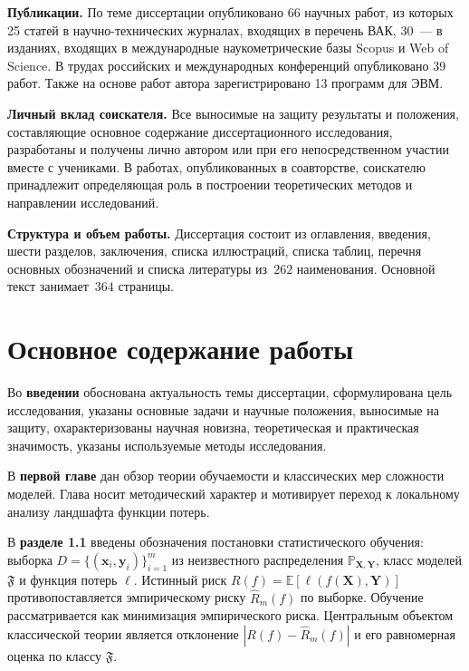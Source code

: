 \documentclass{dissert}
\newcommand{\paragraph}[1]{\noindent\textbf{#1}\quad}
\begin{document}
\paragraph{Публикации.}
По теме диссертации опубликовано 66 научных работ, из
которых 25 статей в научно-технических журналах, входящих в перечень ВАК, 30~--- в изданиях, входящих в международные наукометрические базы Scopus и Web of Science.
В трудах российских и международных конференций опубликовано 39 работ. Также на основе работ автора зарегистрировано 13 программ для ЭВМ.

\paragraph{Личный вклад соискателя.}
Все выносимые на защиту результаты и положения, составляющие основное содержание диссертационного исследования, разработаны и получены лично автором или при его непосредственном участии вместе с учениками.
В работах, опубликованных в соавторстве, соискателю принадлежит определяющая роль в построении теоретических методов и направлении исследований.

\paragraph{Структура и объем работы.}
Диссертация состоит из оглавления, введения, шести разделов, заключения, списка иллюстраций, списка таблиц, перечня основных обозначений и списка литературы из~$262$ наименования. Основной текст занимает~$364$ страницы.

\section*{Основное содержание работы}
Во \textbf{введении} обоснована актуальность темы диссертации,
сформулирована цель исследования, указаны основные задачи и научные положения, выносимые на защиту, охарактеризованы научная новизна, теоретическая и практическая значимость, указаны используемые методы исследования.

В \textbf{первой главе} дан обзор теории обучаемости и классических мер сложности моделей. Глава носит методический характер и мотивирует переход к локальному анализу ландшафта функции потерь.

В \textbf{разделе 1.1} введены обозначения постановки статистического обучения: выборка $D=\{(\mathbf{x}_i,\mathbf{y}_i)\}_{i=1}^m$ из неизвестного распределения $\mathbb{P}_{\mathbf{X},\mathbf{Y}}$, класс моделей $\mathfrak{F}$ и функция потерь $\ell$.
Истинный риск $R(f)=\mathbb{E}[\ell(f(\mathbf{X}),\mathbf{Y})]$ противопоставляется эмпирическому риску $\hat{R}_m(f)$ по выборке.
Обучение рассматривается как минимизация эмпирического риска.
Центральным объектом классической теории является отклонение $|R(f)-\hat{R}_m(f)|$ и его равномерная оценка по классу $\mathfrak{F}$.
\end{document}

